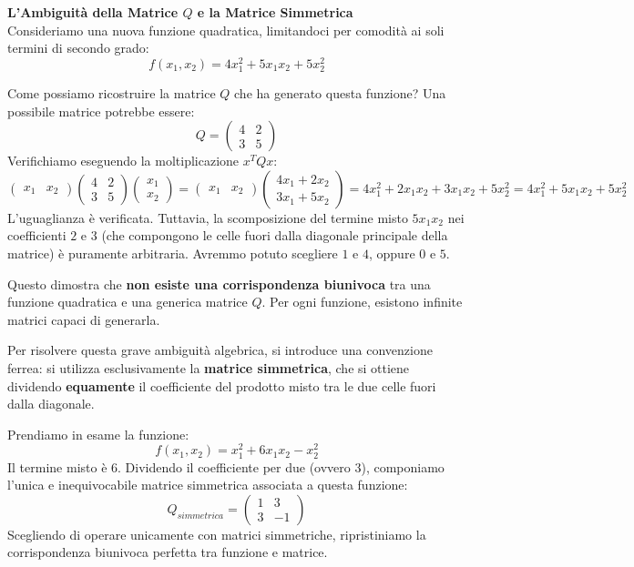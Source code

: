 \documentclass[12pt, a4paper]{article}
\newcommand{\separatore}{\noindent{\color{titlecolor!50}\rule{\textwidth}{0.6pt}}}
\begin{document}
	\vspace{0.6cm}
	\separatore
	\vspace{0.4cm}
	
	\textbf{L'Ambiguità della Matrice $Q$ e la Matrice Simmetrica}\\
	Consideriamo una nuova funzione quadratica, limitandoci per comodità ai soli termini di secondo grado:
	\[ f(x_1, x_2) = 4x_1^2 + 5x_1 x_2 + 5x_2^2 \]
	
	Come possiamo ricostruire la matrice $Q$ che ha generato questa funzione? 
	Una possibile matrice potrebbe essere:
	\[ Q = \begin{pmatrix} 4 & 2 \\ 3 & 5 \end{pmatrix} \]
	Verifichiamo eseguendo la moltiplicazione $x^T Q x$:
	\[
	\begin{pmatrix} x_1 & x_2 \end{pmatrix} \begin{pmatrix} 4 & 2 \\ 3 & 5 \end{pmatrix} \begin{pmatrix} x_1 \\ x_2 \end{pmatrix} = 
	\begin{pmatrix} x_1 & x_2 \end{pmatrix} \begin{pmatrix} 4x_1 + 2x_2 \\ 3x_1 + 5x_2 \end{pmatrix} = 4x_1^2 + 2x_1 x_2 + 3x_1 x_2 + 5x_2^2 = 4x_1^2 + 5x_1 x_2 + 5x_2^2
	\]
	L'uguaglianza è verificata. Tuttavia, la scomposizione del termine misto $5x_1 x_2$ nei coefficienti $2$ e $3$ (che compongono le celle fuori dalla diagonale principale della matrice) è puramente arbitraria. Avremmo potuto scegliere $1$ e $4$, oppure $0$ e $5$. 
	
	Questo dimostra che \textbf{non esiste una corrispondenza biunivoca} tra una funzione quadratica e una generica matrice $Q$. Per ogni funzione, esistono infinite matrici capaci di generarla.
	
	Per risolvere questa grave ambiguità algebrica, si introduce una convenzione ferrea: si utilizza esclusivamente la \textbf{matrice simmetrica}, che si ottiene dividendo \textbf{equamente} il coefficiente del prodotto misto tra le due celle fuori dalla diagonale.
	
	Prendiamo in esame la funzione:
	\[ f(x_1, x_2) = x_1^2 + 6x_1 x_2 - x_2^2 \]
	Il termine misto è $6$. Dividendo il coefficiente per due (ovvero $3$), componiamo l'unica e inequivocabile matrice simmetrica associata a questa funzione:
	\[
	Q_{simmetrica} = \begin{pmatrix} 1 & 3 \\ 3 & -1 \end{pmatrix}
	\]
	Scegliendo di operare unicamente con matrici simmetriche, ripristiniamo la corrispondenza biunivoca perfetta tra funzione e matrice.
	
\end{document}
